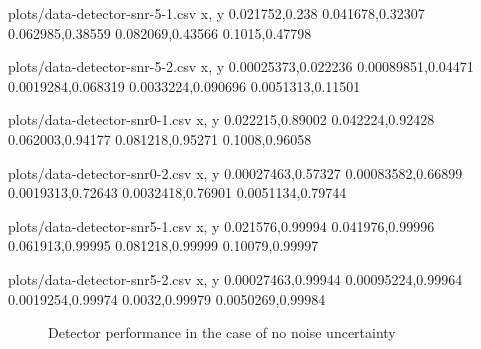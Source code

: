 \documentclass[a4paper, openany, oneside]{memoir}
\begin{document}



\begin{filecontents*}{plots/data-detector-snr-5-1.csv}
x, y
0.021752,0.238
0.041678,0.32307
0.062985,0.38559
0.082069,0.43566
0.1015,0.47798
\end{filecontents*}
\begin{filecontents*}{plots/data-detector-snr-5-2.csv}
x, y
0.00025373,0.022236
0.00089851,0.04471
0.0019284,0.068319
0.0033224,0.090696
0.0051313,0.11501
\end{filecontents*}
\begin{filecontents*}{plots/data-detector-snr0-1.csv}
x, y
0.022215,0.89002
0.042224,0.92428
0.062003,0.94177
0.081218,0.95271
0.1008,0.96058
\end{filecontents*}
\begin{filecontents*}{plots/data-detector-snr0-2.csv}
x, y
0.00027463,0.57327
0.00083582,0.66899
0.0019313,0.72643
0.0032418,0.76901
0.0051134,0.79744
\end{filecontents*}
\begin{filecontents*}{plots/data-detector-snr5-1.csv}
x, y
0.021576,0.99994
0.041976,0.99996
0.061913,0.99995
0.081218,0.99999
0.10079,0.99997
\end{filecontents*}
\begin{filecontents*}{plots/data-detector-snr5-2.csv}
x, y
0.00027463,0.99944
0.00095224,0.99964
0.0019254,0.99974
0.0032,0.99979
0.0050269,0.99984
\end{filecontents*}

\begin{figure}
	\centering
	\caption{Detector performance in the case of no noise uncertainty}
	\label{fig:plot-detector}
\end{figure}
\end{document}
